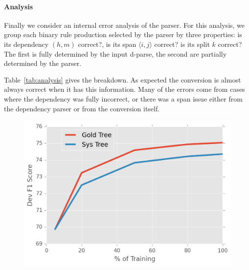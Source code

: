 \documentclass[11pt,letterpaper]{article}
\newcommand{\Span}[1]{\langle #1 \rangle}
\begin{document}

\paragraph{Analysis}
\label{sec:analysis}

Finally we consider an internal error analysis of
the parser. For this analysis, we group each binary rule production
selected by the parser by three properties:
is its dependency $(h, m)$ correct?, is its span $\Span{i,j}$ correct? 
is its split $k$ correct? The first is fully determined by the 
input d-parse, the second are partially determined by the parser. 

Table~\ref{tab:analysis} gives the breakdown. As expected the conversion 
is almost always correct when it has this information. Many of 
the errors come from cases where the dependency was fully 
incorrect, or there was a span issue either from the dependency 
parser or from the conversion itself.





\begin{figure}
  \centering
  \includegraphics[scale=0.5]{../notebooks/data}
\label{fig:dataamo}
\end{figure}
\end{document}
